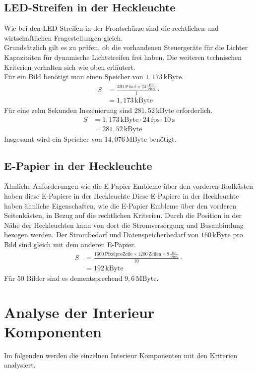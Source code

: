 \subsection{LED-Streifen in der Heckleuchte}
Wie bei den LED-Streifen in der Frontschürze sind die rechtlichen und wirtschaftlichen Fragestellungen gleich. \\
Grundsätzlich gilt es zu prüfen, ob die vorhandenen Steuergeräte für die Lichter Kapazitäten für dynamische Lichtstreifen frei haben.
Die weiteren technischen Kriterien verhalten sich wie oben erläutert. \\
Für ein Bild benötigt man einen Speicher von $ 1,173\,\mathrm{kByte} $.
\begin{align}
	S &= \frac{391\,\mathrm{Pixel} \times 24\,\frac{\mathrm{Bit}}{\mathrm{Pixel}}}{1} \cdot \\
	&= 1,173\,\mathrm{kByte}
\end{align}
Für eine zehn Sekunden Inszenierung sind $ 281,52\,\mathrm{kByte} $ erforderlich.
\begin{align}
	S &= 1,173\,\mathrm{kByte} \cdot 24\,\mathrm{fps} \cdot 10\,\mathrm{s} \\
	&= 281,52\,\mathrm{kByte}
\end{align}
Insgesamt wird ein Speicher von $ 14,076\,\mathrm{MByte} $ benötigt.
\subsection{E-Papier in der Heckleuchte}
Ähnliche Anforderungen wie die E-Papier Embleme über den vorderen Radkästen haben diese E-Papiere in der Heckleuchte
Diese E-Papiere in der Heckleuchte haben ähnliche Eigenschaften, wie die E-Papier Embleme über den vorderen Seitenkästen, in Bezug auf die rechtlichen Kriterien. Durch die Position in der Nähe der Heckleuchten kann von dort die Stromversorgung und Busanbindung bezogen werden. Der Strombedarf und Datenspeicherbedarf von $ 160\,\mathrm{kByte} $ pro Bild sind gleich mit dem anderen E-Papier. 
\begin{align}
	S &= \frac{1600\,\mathrm{Pixel pro Zeile} \times 1200\,\mathrm{Zeilen} \times 8\,\frac{\mathrm{Bit}}{\mathrm{Pixel}}}{10} \cdot \\
	&= 192\,\mathrm{kByte}
\end{align}
Für 50 Bilder sind es dementsprechend $ 9,6\,\mathrm{MByte} $.
\section{Analyse der Interieur Komponenten}
Im folgenden werden die einzelnen Interieur Komponenten mit den Kriterien analysiert.
